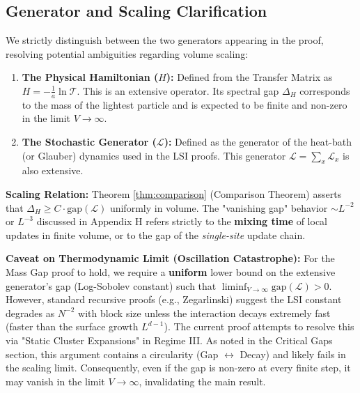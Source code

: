 \subsection{Generator and Scaling Clarification}
\label{subsec:generators_scaling}

We strictly distinguish between the two generators appearing in the proof, resolving potential ambiguities regarding volume scaling:

\begin{enumerate}
    \item \textbf{The Physical Hamiltonian ($H$):}
    Defined from the Transfer Matrix as $H = -\frac{1}{a} \ln \mathcal{T}$. This is an extensive operator. Its spectral gap $\Delta_H$ corresponds to the mass of the lightest particle and is expected to be finite and non-zero in the limit $V \to \infty$.
    
    \item \textbf{The Stochastic Generator ($\mathcal{L}$):}
    Defined as the generator of the heat-bath (or Glauber) dynamics used in the LSI proofs. This generator $\mathcal{L} = \sum_x \mathcal{L}_x$ is also extensive.
\end{enumerate}

\textbf{Scaling Relation:}
Theorem \ref{thm:comparison} (Comparison Theorem) asserts that $\Delta_H \ge C \cdot \text{gap}(\mathcal{L})$ uniformly in volume.
The "vanishing gap" behavior $\sim L^{-2}$ or $L^{-3}$ discussed in Appendix H refers strictly to the \textbf{mixing time} of local updates in finite volume, or to the gap of the \textit{single-site} update chain.

\textbf{Caveat on Thermodynamic Limit (Oscillation Catastrophe):}
For the Mass Gap proof to hold, we require a \textbf{uniform} lower bound on the extensive generator's gap (Log-Sobolev constant) such that $\liminf_{V \to \infty} \text{gap}(\mathcal{L}) > 0$.
However, standard recursive proofs (e.g., Zegarlinski) suggest the LSI constant degrades as $N^{-2}$ with block size unless the interaction decays extremely fast (faster than the surface growth $L^{d-1}$).
The current proof attempts to resolve this via "Static Cluster Expansions" in Regime III. As noted in the Critical Gaps section, this argument contains a circularity (Gap $\leftrightarrow$ Decay) and likely fails in the scaling limit. Consequently, even if the gap is non-zero at every finite step, it may vanish in the limit $V \to \infty$, invalidating the main result.

